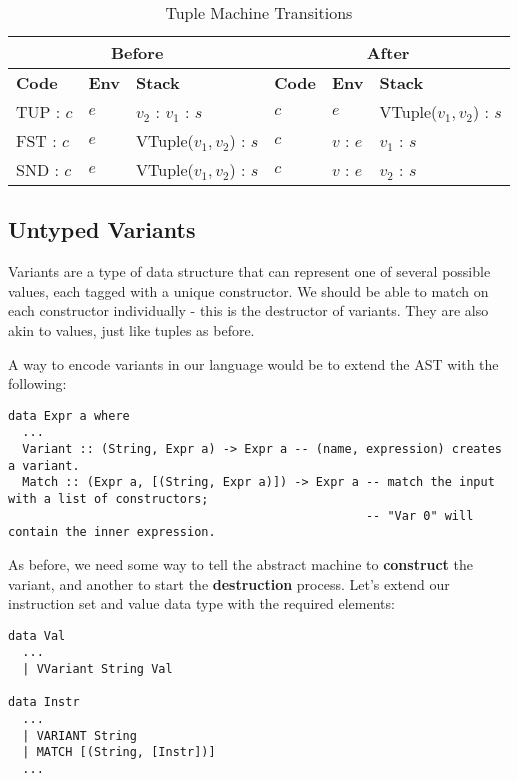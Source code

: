 \begin{table}[h]
    \centering
    \small
    \begin{tabular}{|l|l|l||l|l|l|}
        \hline
        \multicolumn{3}{|c||}{\textbf{Before}} & \multicolumn{3}{c|}{\textbf{After}} \\
        \hline
        \textbf{Code} & \textbf{Env} & \textbf{Stack} & \textbf{Code} & \textbf{Env} & \textbf{Stack} \\
        \hline
        TUP : \(c\) & \( e \) & \( v_2 \) : \( v_1 \) : \( s \) & \( c \) & \( e \) & VTuple(\( v_1, v_2 \)) : \( s \) \\
        FST : \(c\) & \( e \) & VTuple(\( v_1, v_2 \)) : \( s \) & \( c \) & \( v \) : \( e \) & \( v_1 \) : \( s \) \\
        SND : \(c\) & \( e \) & VTuple(\( v_1, v_2 \)) : \( s \) & \( c \) & \( v \) : \( e \) & \( v_2 \) : \( s \) \\
        \hline
    \end{tabular}
    \caption{Tuple Machine Transitions}
\end{table}

\subsection{Untyped Variants}

Variants are a type of data structure that can represent one of several possible values,
each tagged with a unique constructor. We should be able to match on each constructor individually - this is the destructor of variants.
They are also akin to values, just like tuples as before.

A way to encode variants in our language would be to extend the AST with the following:

\begin{lstlisting}
data Expr a where
  ...
  Variant :: (String, Expr a) -> Expr a -- (name, expression) creates a variant.
  Match :: (Expr a, [(String, Expr a)]) -> Expr a -- match the input with a list of constructors;
                                                  -- "Var 0" will contain the inner expression.
\end{lstlisting}

As before, we need some way to tell the abstract machine to \textbf{construct} the variant, and another to start the \textbf{destruction} process.
Let's extend our instruction set and value data type with the required elements:

\begin{lstlisting}
data Val
  ...
  | VVariant String Val

data Instr
  ...
  | VARIANT String
  | MATCH [(String, [Instr])]
  ...
\end{lstlisting}

